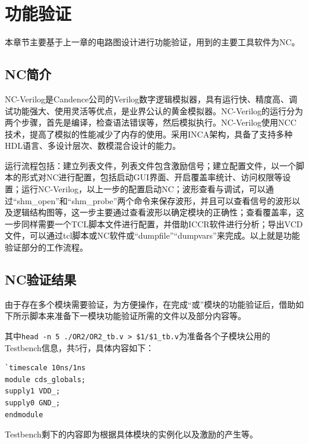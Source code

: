 \chapter{功能验证}
本章节主要基于上一章的电路图设计进行功能验证，用到的主要工具软件为NC。
\section{NC简介}
NC-Verilog是Candence公司的Verilog数字逻辑模拟器，具有运行快、精度高、调试功能强大、使用灵活等优点，是业界公认的黄金模拟器。NC-Verilog的运行分为两个步骤，首先是编译，检查语法错误等，然后模拟执行。NC-Verilog使用NCC技术，提高了模拟的性能减少了内存的使用。采用INCA架构，具备了支持多种HDL语言、多设计层次、数模混合设计的能力。

运行流程包括：建立列表文件，列表文件包含激励信号；建立配置文件，以一个脚本的形式对NC进行配置，包括启动GUI界面、开启覆盖率统计、访问权限等设置；运行NC-Verilog，以上一步的配置启动NC；波形查看与调试，可以通过“shm\_open”和“shm\_probe”两个命令来保存波形，并且可以查看信号的波形以及逻辑结构图等，这一步主要通过查看波形以确定模块的正确性；查看覆盖率，这一步同样需要一个TCL脚本文件进行配置，并借助ICCR软件进行分析；导出VCD文件，可以通过tcl脚本或NC软件或“dumpfile”“dumpvars”来完成。以上就是功能验证部分的工作流程。 
\section{NC验证结果}
由于存在多个模块需要验证，为方便操作，在完成“或”模块的功能验证后，借助如下所示脚本来准备下一模块功能验证所需的文件以及部分内容等。


其中\verb|head -n 5 ./OR2/OR2_tb.v > $1/$1_tb.v|为准备各个子模块公用的Testbench信息，共5行，具体内容如下：
{
\footnotesize
\begin{verbatim}
`timescale 10ns/1ns
module cds_globals;
supply1 VDD_;
supply0 GND_;
endmodule
\end{verbatim}
}
\noindent Testbench剩下的内容即为根据具体模块的实例化以及激励的产生等。

